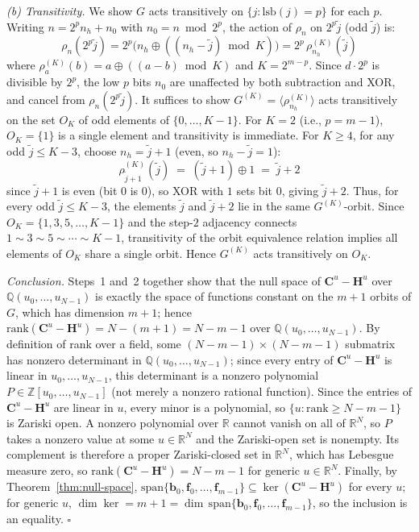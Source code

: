 \documentclass[11pt]{article}
\begin{document}
\smallskip
\emph{(b) Transitivity.} We show $G$ acts transitively on $\{j : \mathrm{lsb}(j) = p\}$ for each $p$. Writing $n = 2^p n_h + n_0$ with $n_0 = n\bmod 2^p$, the action of $\rho_n$ on $2^p\tilde{j}$ (odd $\tilde{j}$) is:
\[
\rho_n(2^p \tilde{j}) = 2^p\bigl(n_h \oplus ((n_h - \tilde{j})\bmod K)\bigr) = 2^p\,\rho^{(K)}_{n_h}(\tilde{j})
\]
where $\rho^{(K)}_a(b) = a\oplus((a-b)\bmod K)$ and $K = 2^{m-p}$. Since $d\cdot 2^p$ is divisible by $2^p$, the low $p$ bits $n_0$ are unaffected by both subtraction and XOR, and cancel from $\rho_n(2^p\tilde{j})$. It suffices to show $G^{(K)} = \langle\rho^{(K)}_{n_h}\rangle$ acts transitively on the set $O_K$ of odd elements of $\{0,\ldots,K-1\}$. For $K=2$ (i.e., $p=m-1$), $O_K = \{1\}$ is a single element and transitivity is immediate. For $K \geq 4$, for any odd $\tilde{j} \leq K-3$, choose $n_h = \tilde{j}+1$ (even, so $n_h - \tilde{j} = 1$):
\[
\rho^{(K)}_{\tilde{j}+1}(\tilde{j}) \;=\; (\tilde{j}+1)\oplus 1 \;=\; \tilde{j}+2
\]
since $\tilde{j}+1$ is even (bit 0 is $0$), so XOR with $1$ sets bit 0, giving $\tilde{j}+2$. Thus, for every odd $\tilde{j} \leq K-3$, the elements $\tilde{j}$ and $\tilde{j}+2$ lie in the same $G^{(K)}$-orbit. Since $O_K = \{1,3,5,\ldots,K-1\}$ and the step-$2$ adjacency connects $1\sim 3\sim 5\sim\cdots\sim K-1$, transitivity of the orbit equivalence relation implies all elements of $O_K$ share a single orbit. Hence $G^{(K)}$ acts transitively on $O_K$.

\medskip
\noindent\textit{Conclusion.} Steps~1 and~2 together show that the null space of $\mathbf{C}^u-\mathbf{H}^u$ over $\mathbb{Q}(u_0,\ldots,u_{N-1})$ is exactly the space of functions constant on the $m+1$ orbits of $G$, which has dimension $m+1$; hence $\mathrm{rank}(\mathbf{C}^u-\mathbf{H}^u) = N-(m+1) = N-m-1$ over $\mathbb{Q}(u_0,\ldots,u_{N-1})$. By definition of rank over a field, some $(N-m-1)\times(N-m-1)$ submatrix has nonzero determinant in $\mathbb{Q}(u_0,\ldots,u_{N-1})$; since every entry of $\mathbf{C}^u-\mathbf{H}^u$ is linear in $u_0,\ldots,u_{N-1}$, this determinant is a nonzero polynomial $P\in\mathbb{Z}[u_0,\ldots,u_{N-1}]$ (not merely a nonzero rational function). Since the entries of $\mathbf{C}^u-\mathbf{H}^u$ are linear in $u$, every minor is a polynomial, so $\{u:\mathrm{rank}\geq N-m-1\}$ is Zariski open. A nonzero polynomial over $\mathbb{R}$ cannot vanish on all of $\mathbb{R}^N$, so $P$ takes a nonzero value at some $u\in\mathbb{R}^N$ and the Zariski-open set is nonempty. Its complement is therefore a proper Zariski-closed set in $\mathbb{R}^N$, which has Lebesgue measure zero, so $\mathrm{rank}(\mathbf{C}^u-\mathbf{H}^u) = N-m-1$ for generic $u\in\mathbb{R}^N$. Finally, by Theorem~\ref{thm:null-space}, $\mathrm{span}\{\mathbf{b}_0, \mathbf{f}_0, \ldots, \mathbf{f}_{m-1}\} \subseteq \ker(\mathbf{C}^u - \mathbf{H}^u)$ for every $u$; for generic $u$, $\dim\ker = m+1 = \dim\,\mathrm{span}\{\mathbf{b}_0, \mathbf{f}_0, \ldots, \mathbf{f}_{m-1}\}$, so the inclusion is an equality. $\square$
\end{document}
